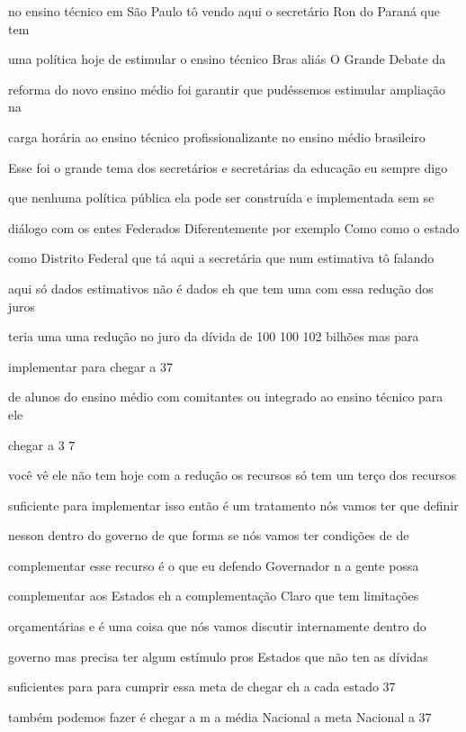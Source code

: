 \documentclass[a4paper,12pt]{article}
\begin{document}
no ensino técnico em São Paulo tô vendo aqui o secretário Ron do Paraná que tem

uma política hoje de estimular o ensino técnico Bras aliás O Grande Debate da

reforma do novo ensino médio foi garantir que pudéssemos estimular ampliação na

carga horária ao ensino técnico profissionalizante no ensino médio brasileiro

Esse foi o grande tema dos secretários e secretárias da educação eu sempre digo

que nenhuma política pública ela pode ser construída e implementada sem se

diálogo com os entes Federados Diferentemente por exemplo Como como o estado

como Distrito Federal que tá aqui a secretária que num estimativa tô falando

aqui só dados estimativos não é dados eh que tem uma com essa redução dos juros

teria uma uma redução no juro da dívida de 100 100 102 bilhões mas para

implementar para chegar a 37%

de alunos do ensino médio com comitantes ou integrado ao ensino técnico para ele

chegar a 3 7%

você vê ele não tem hoje com a redução os recursos só tem um terço dos recursos

suficiente para implementar isso então é um tratamento nós vamos ter que definir

nesson dentro do governo de que forma se nós vamos ter condições de de

complementar esse recurso é o que eu defendo Governador n a gente possa

complementar aos Estados eh a complementação Claro que tem limitações

orçamentárias e é uma coisa que nós vamos discutir internamente dentro do

governo mas precisa ter algum estímulo pros Estados que não ten as dívidas

suficientes para para cumprir essa meta de chegar eh a cada estado 37%

também podemos fazer é chegar a m a média Nacional a meta Nacional a 37%
\end{document}
